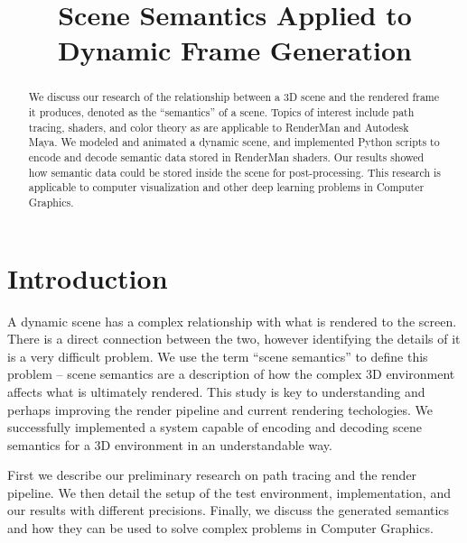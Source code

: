 \documentclass[conference]{IEEEtran}
\begin{document}
\title{Scene Semantics Applied to \\ Dynamic Frame Generation}

\author{
}

\maketitle

\begin{abstract}
We discuss our research of
the relationship between a 3D scene and the rendered frame it produces,
denoted as the ``semantics'' of a scene.
Topics of interest include path tracing, shaders, and color theory
as are applicable to RenderMan and Autodesk Maya.
We modeled and animated a dynamic scene,
and implemented Python scripts to encode and decode semantic data
stored in RenderMan shaders.
Our results showed how semantic data could be stored inside the scene
for post-processing.
This research is applicable to computer visualization
and other deep learning problems in Computer Graphics.
\end{abstract}

\section{Introduction}
\label{sec:introduction}
A dynamic scene has a complex relationship with what is rendered to the screen.
There is a direct connection between the two,
however identifying the details of it is a very difficult
problem.
We use the term ``scene semantics'' to define this problem --
scene semantics are a description of how the complex 3D environment
affects what is ultimately rendered.
This study is key to understanding and perhaps improving the
render pipeline and current rendering techologies.
We successfully implemented a system capable of encoding and decoding
scene semantics for a 3D environment in an understandable way.

First we describe our preliminary research on path tracing and the render pipeline.
We then detail the setup of the test environment, implementation,
and our results with different precisions.
Finally, we discuss the generated semantics and how they can be used to solve
complex problems in Computer Graphics.
\end{document}
